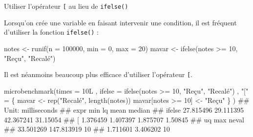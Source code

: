 \documentclass[12pt,ignorenonframetext,]{beamer}
\newenvironment{Shaded}{}{}
\newcommand{\KeywordTok}[1]{\textcolor[rgb]{0.00,0.00,1.00}{#1}}
\newcommand{\DataTypeTok}[1]{#1}
\newcommand{\DecValTok}[1]{#1}
\newcommand{\StringTok}[1]{\textcolor[rgb]{0.00,0.50,0.50}{#1}}
\newcommand{\OperatorTok}[1]{#1}
\newcommand{\NormalTok}[1]{#1}
\renewenvironment{Shaded}{\begin{snugshade}}{\end{snugshade}}
\begin{document}
\begin{frame}[fragile]{Utiliser l'opérateur \texttt{{[}} au lieu de
\texttt{ifelse()}}

\small
Lorsqu'on crée une variable en faisant intervenir une condition, il est
fréquent d'utiliser la fonction \texttt{ifelse()} :

\footnotesize

\begin{Shaded}
\begin{Highlighting}[]
\NormalTok{notes <-}\StringTok{ }\KeywordTok{runif}\NormalTok{(}\DataTypeTok{n =} \DecValTok{100000}\NormalTok{, }\DataTypeTok{min =} \DecValTok{0}\NormalTok{, }\DataTypeTok{max =} \DecValTok{20}\NormalTok{)}
\NormalTok{mavar <-}\StringTok{ }\KeywordTok{ifelse}\NormalTok{(notes }\OperatorTok{>=}\StringTok{ }\DecValTok{10}\NormalTok{, }\StringTok{"Reçu"}\NormalTok{, }\StringTok{"Recalé"}\NormalTok{)}
\end{Highlighting}
\end{Shaded}

\pause \small
Il est néanmoins beaucoup plus efficace d'utiliser l'opérateur
\texttt{{[}}.

\footnotesize

\begin{Shaded}
\begin{Highlighting}[]
\KeywordTok{microbenchmark}\NormalTok{(}\DataTypeTok{times =}\NormalTok{ 10L}
\NormalTok{  , }\DataTypeTok{ifelse =} \KeywordTok{ifelse}\NormalTok{(notes }\OperatorTok{>=}\StringTok{ }\DecValTok{10}\NormalTok{, }\StringTok{"Reçu"}\NormalTok{, }\StringTok{"Recalé"}\NormalTok{)}
\NormalTok{  , }\StringTok{"["}\NormalTok{ =}\StringTok{ }\NormalTok{\{}
\NormalTok{    mavar <-}\StringTok{ }\KeywordTok{rep}\NormalTok{(}\StringTok{"Recalé"}\NormalTok{, }\KeywordTok{length}\NormalTok{(notes))}
\NormalTok{    mavar[notes }\OperatorTok{>=}\StringTok{ }\DecValTok{10}\NormalTok{] <-}\StringTok{ "Reçu"}
\NormalTok{  \} }
\NormalTok{)}
\NormalTok{  ## Unit: milliseconds}
\NormalTok{  ##    expr       min        lq      mean   median}
\NormalTok{  ##  ifelse 27.815496 29.111395 42.367241 31.15054}
\NormalTok{  ##       [  1.376459  1.407397  1.875707  1.50845}
\NormalTok{  ##         uq        max neval}
\NormalTok{  ##  33.501269 147.813919    10}
\NormalTok{  ##   1.711601   3.406202    10}
\end{Highlighting}
\end{Shaded}

\end{frame}
\end{document}
